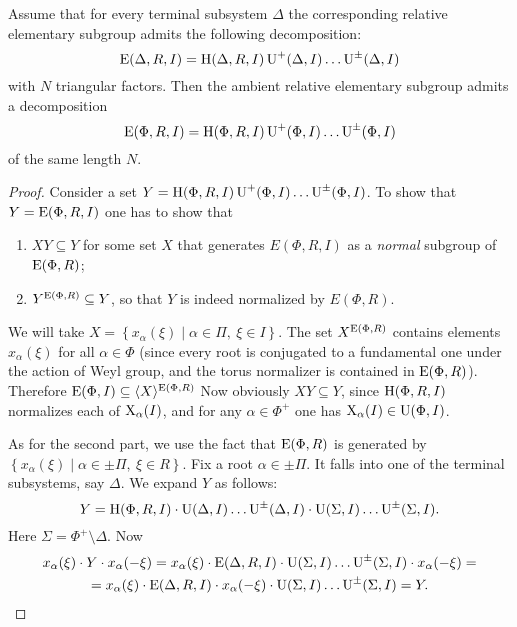 \begin{thm}
Assume that for every terminal subsystem $\Delta$ the corresponding relative elementary subgroup admits the following decomposition:
\[ \operatorname{E}(\Delta,R,I)=\operatorname{H}(\Delta,R,I)\operatorname{U}^+(\Delta,I)\ldots\operatorname{U}^\pm(\Delta,I) \]
with $N$ triangular factors. Then the ambient relative elementary subgroup admits a decomposition
\[ \operatorname{E}(\Phi,R,I)=\operatorname{H}(\Phi,R,I)\operatorname{U}^+(\Phi,I)\ldots\operatorname{U}^\pm(\Phi,I) \]
of the same length $N$.
\end{thm}
\begin{proof}
Consider a set $Y=\operatorname{H}(\Phi,R,I)\operatorname{U}^+(\Phi,I)\ldots\operatorname{U}^\pm(\Phi,I)$. To show that $Y=\operatorname{E}(\Phi,R,I)$ one has to show that
\begin{enumerate}
\item $XY\subseteq Y$ for some set $X$ that generates $E(\Phi,R,I)$ as a \emph{normal} subgroup of $\operatorname{E}(\Phi,R)$;
\item $Y^{\operatorname{E}(\Phi,R)}\subseteq Y$, so that $Y$ is indeed normalized by $E(\Phi,R)$.
\end{enumerate}
We will take $X=\left\{x_\alpha(\xi)\mid\alpha\in\Pi,\ \xi\in I \right\}$. The set $X^{\operatorname{E}(\Phi,R)}$ contains elements $x_\alpha(\xi)$ for all $\alpha\in\Phi$ (since every root is conjugated to a fundamental one under the action of Weyl group, and the torus normalizer is contained in $\operatorname{E}(\Phi,R)$). Therefore $\operatorname{E}(\Phi,I)\subseteq\langle X\rangle^{\operatorname{E}(\Phi,R)}$ Now obviously $XY\subseteq Y$, since $\operatorname{H}(\Phi,R,I)$ normalizes each of $\operatorname{X}_\alpha(I)$, and for any $\alpha\in\Phi^+$ one has $\operatorname{X}_\alpha(I)\in\operatorname{U}(\Phi,I)$.

As for the second part, we use the fact that $\operatorname{E}(\Phi,R)$ is generated by $\left\{x_\alpha(\xi)\mid\alpha\in\pm\Pi,\ \xi\in R\right\}$. Fix a root $\alpha\in\pm\Pi$. It falls into one of the terminal subsystems, say $\Delta$. We expand $Y$ as follows:
\[ Y=\operatorname{H}(\Phi,R,I)\cdot\operatorname{U}(\Delta,I)\ldots\operatorname{U}^\pm(\Delta,I)\cdot\operatorname{U}(\Sigma,I)\ldots\operatorname{U}^\pm(\Sigma,I). \]
Here $\Sigma=\Phi^+\setminus\Delta$. Now
\begin{multline*}
x_\alpha(\xi)\cdot Y\cdot x_\alpha(-\xi) = x_\alpha(\xi)\cdot\operatorname{E}(\Delta,R,I)\cdot\operatorname{U}(\Sigma,I)\ldots\operatorname{U}^\pm(\Sigma,I)\cdot x_\alpha(-\xi) =\\
= x_\alpha(\xi)\cdot\operatorname{E}(\Delta,R,I)\cdot x_\alpha(-\xi)\cdot\operatorname{U}(\Sigma,I)\ldots\operatorname{U}^\pm(\Sigma,I) = Y.\qedhere
\end{multline*}
\end{proof}